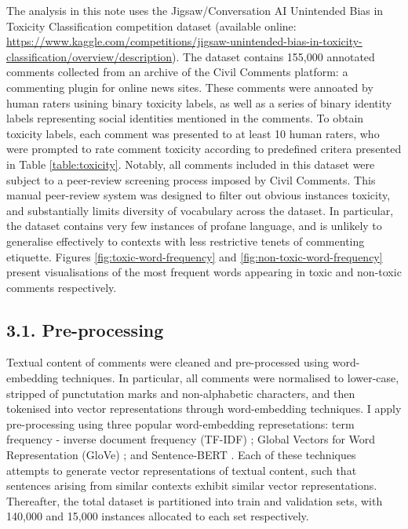 
The analysis in this note uses the Jigsaw/Conversation AI Unintended Bias in Toxicity Classification competition dataset (available online: \url{https://www.kaggle.com/competitions/jigsaw-unintended-bias-in-toxicity-classification/overview/description}). The dataset contains 155,000 annotated comments collected from an archive of the Civil Comments platform: a commenting plugin for online news sites. 
These comments were annoated by human raters usining binary toxicity labels, as well as a series of binary identity labels representing social identities mentioned in the comments. 
To obtain toxicity labels, each comment was presented to at least 10 human raters, who were prompted to rate comment toxicity according to predefined critera presented in Table \ref{table:toxicity}. 
Notably, all comments included in this dataset were subject to a peer-review screening process imposed by Civil Comments. 
This manual peer-review system was designed to filter out obvious instances toxicity, and substantially limits diversity of vocabulary across the dataset. 
In particular, the dataset contains very few instances of profane language, and is unlikely to generalise effectively to contexts with less restrictive tenets of commenting etiquette.
Figures \ref{fig:toxic-word-frequency} and \ref{fig:non-toxic-word-frequency} present visualisations of the most frequent words appearing in toxic and non-toxic comments respectively. 

\subsection*{3.1. Pre-processing}

Textual content of comments were cleaned and pre-processed using word-embedding techniques. In particular, all comments were normalised to lower-case, stripped of punctutation marks and non-alphabetic characters, and then tokenised into vector representations through word-embedding techniques. I apply pre-processing using three popular word-embedding represetations: term frequency - inverse document frequency (TF-IDF) \cite{luhn1957statistical,jones1972statistical}; Global Vectors for Word Representation (GloVe) \cite{pennington2014glove}; and Sentence-BERT \cite{reimers2019sentence}. Each of these techniques attempts to generate vector representations of textual content, such that sentences arising from similar contexts exhibit similar vector representations. Thereafter, the total dataset is partitioned into train and validation sets, with 140,000 and 15,000 instances allocated to each set respectively. 


